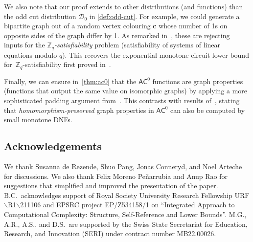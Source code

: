 \documentclass[11pt]{article}
\theoremstyle{plain}
\theoremstyle{definition}
\theoremstyle{remark}
\newcommand{\complexityfont}[1]{\mathsf{#1}}
\def\AC           {\complexityfont{AC}}
\def\cald{{\mathcal D}}
\begin{document}
We also note that our proof extends to other distributions (and functions) than the odd cut distribution $\cald_0$ in \cref{def:odd-cut}. For example, we could generate a bipartite graph out of a random vertex colouring $\bm c$ whose number of 1s on opposite sides of the graph differ by 1. As remarked in~\cite{Feder1998}, these are rejecting inputs for the \emph{$\mathbb{Z}_q$-satisfiability} problem (satisfiability of systems of linear equations modulo $q$). This recovers the exponential monotone circuit lower bound for~$\mathbb{Z}_q$-satisfiability first proved in~\cite{Garg2020,Goos2019}.


Finally, we can ensure in~\cref{thm:ac0} that the $\AC^0$ functions are graph properties (functions that output the same value on isomorphic graphs) by applying a more sophisticated padding argument from~\cite[Lemma
3.6]{Cavalar2023}. This contrasts with results of~\cite{Rossman2008,Rossman2017},
stating that  \emph{homomorphism-preserved} graph properties in $\AC^0$ 
can also be computed by small monotone DNFs.



\bigskip

\subsection*{Acknowledgements}
We thank Susanna de Rezende, Shuo Pang, Jonas Conneryd, and Noel Arteche for
discussions. 
We also thank 
Felix Moreno Peñarrubia and Anup Rao 
for suggestions that simplified and improved the presentation of the paper.
B.C.\ acknowledges support of Royal Society University Research Fellowship URF$\backslash$R1$\backslash$211106
and
EPSRC project EP/Z534158/1 on ``Integrated Approach to Computational Complexity: Structure, Self-Reference and Lower Bounds''. M.G., A.R., A.S., and D.S.\ are supported by the Swiss State
Secretariat for Education, Research, and Innovation (SERI) under contract number
MB22.00026.


\bigskip



\let\OLDthebibliography\thebibliography
\renewcommand\thebibliography[1]{
   \OLDthebibliography{#1}
   \setlength{\parskip}{3pt}
}

\small
{}
\renewcommand{\path}[1]{\footnotesize\Doi{#1}}
\renewcommand{\url}[1]{\href{#1}{\small\Doi{#1}}}


 
\end{document}
